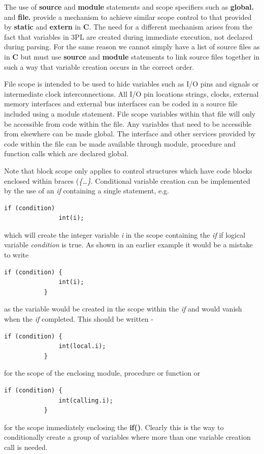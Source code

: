         The use of {\bf source} and {\bf module} statements and scope specifiers
        such as {\bf global.} and {\bf file.} provide a mechanism to achieve
        similar scope control to that provided by {\bf static} and {\bf extern}
        in {\bf C}. The need for a different mechanism arises from the fact that
        variables in 3PL are created during immediate execution, not declared
        during parsing. For the same reason we cannot simply have a list of
        source files as in {\bf C} but must use {\bf source} and {\bf module}
        statements to link source files together in such a way that variable
        creation occurs in the correct order.
        
        File scope is intended to be used to hide variables such as I/O pins and
        signals or intermediate clock interconnections. All I/O pin locations
        strings, clocks, external memory interfaces and external bus interfaces can
        be coded in a source file included using a module statement. File scope
        variables within that file will only be accessible from code within the
        file. Any variables that need to be accessible from elsewhere can be made
        global. The interface and other services provided by code within the file
        can be made available through module, procedure and function calls which
        are declared global.
        
        Note that block scope only applies to control structures which have
        code blocks enclosed within braces ({\em \{\dots\}}.
        Conditional variable creation can be implemented by the use
        of an {\em if} containing a single statement, e.g.
        \begin{lstlisting}[gobble=8, language=threepl]
           if (condition)
               int(i);
        \end{lstlisting}
        which will create the integer variable {\em i} in the scope
        containing the {\em if} if logical variable {\em condition} is true.
        As shown in an earlier example it would be a mistake to write
        \begin{lstlisting}[gobble=8, language=threepl]
           if (condition) {
               int(i);
           }
        \end{lstlisting}
        as the variable would be created in the scope within the {\em if} and
        would vanish when the {\em if} completed. This should be written -
        \begin{lstlisting}[gobble=8, language=threepl]
           if (condition) {
               int(local.i);
           }
        \end{lstlisting}
        for the scope of the enclosing module, procedure or function or
        \begin{lstlisting}[gobble=8, language=threepl]
           if (condition) {
               int(calling.i);
           }
        \end{lstlisting}
        for the scope immediately enclosing the {\bf if()}. Clearly this is
        the way to conditionally create a group of variables where more than
        one variable creation call is needed. 
        
